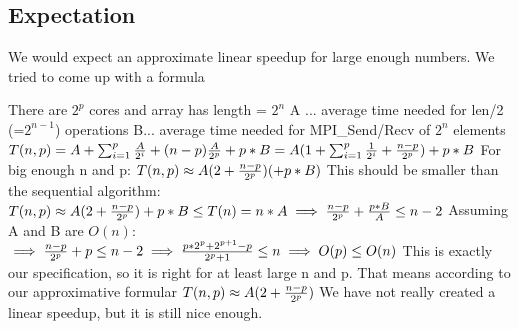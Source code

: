 \subsection{Expectation}
We would expect an approximate linear speedup for large enough numbers. We tried to come up with a formula

There are \(2^{p}\) cores and array has length = \(2^{n}\)\newline
A ... average time needed for len/2 (=\(2^{n-1}\)) operations\newline
B... average time needed for MPI\_Send/Recv of \(2^{n}\) elements\newline\newline
\begin{math}
T(n, p) = A + \sum_{i=1}^{p} {A \over 2^i} + (n - p) {A \over 2^p} + p*B 
= A (1 + \sum_{i=1}^{p} {1 \over 2^i} + {n - p \over 2^p}) + p*B
\end{math}\newline
For big enough n and p:\newline
\begin{math}
T(n, p) \approx A (2 + {n - p \over 2^p})(+ p * B)
\end{math}\newline
This should be smaller than the sequential algorithm: \newline
\begin{math}
T(n, p) \approx A (2 + {n - p \over 2^p})+ p * B \leq T(n) = n * A
\implies {n - p \over 2^p} + {p*B \over A} \leq n - 2
\end{math}\newline
Assuming A and B are \(O(n)\):\newline
\begin{math}
\implies {n - p \over 2^p} + p \leq n - 2 
\implies {p*2^p + 2^{p+1} -p \over 2^p +1} \leq n
\implies O(p) \leq O(n)
\end{math}\newline
This is exactly our specification, so it is right for at least large n and p. That means according to our approximative formular \newline
\begin{math}
T(n, p) \approx A (2 + {n - p \over 2^p})
\end{math}\newline
We have not really created a linear speedup, but it is still nice enough.  